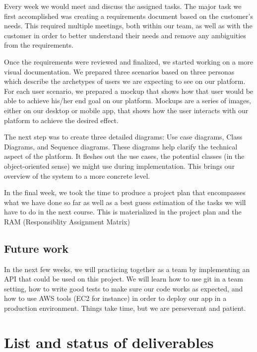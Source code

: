 \documentclass[]{article}
\begin{document}
Every week we would meet and discuss the assigned tasks. The major task
we first accomplished was creating a requirements document based on the
customer's needs. This required multiple meetings, both within our team,
as well as with the customer in order to better understand their needs
and remove any ambiguities from the requirements.

Once the requirements were reviewed and finalized, we started working on
a more visual documentation. We prepared three scenarios based on three
personas which describe the archetypes of users we are expecting to see
on our platform. For each user scenario, we prepared a mockup that shows
how that user would be able to achieve his/her end goal on our platform.
Mockups are a series of images, either on our desktop or mobile app,
that shows how the user interacts with our platform to achieve the
desired effect.

The next step was to create three detailed diagrams: Use case diagrams,
Class Diagrams, and Sequence diagrams. These diagrams help clarify the
technical aspect of the platform. It fleshes out the use cases, the
potential classes (in the object-oriented sense) we might use during
implementation. This brings our overview of the system to a more
concrete level.

In the final week, we took the time to produce a project plan that
encompasses what we have done so far as well as a best guess estimation
of the tasks we will have to do in the next course. This is materialized
in the project plan and the RAM (Responsiblity Assignment Matrix)

\hypertarget{future-work}{%
    \subsection{Future work}\label{future-work}}

In the next few weeks, we will practicing together as a team by
implementing an API that could be used on this project. We will learn
how to use git in a team setting, how to write good tests to make sure
our code works as expected, and how to use AWS tools (EC2 for instance)
in order to deploy our app in a production environment. Things take
time, but we are perseverant and patient.

\hypertarget{list-and-status-of-deliverables}{%
    \section{List and status of
      deliverables}\label{list-and-status-of-deliverables}}
\end{document}
